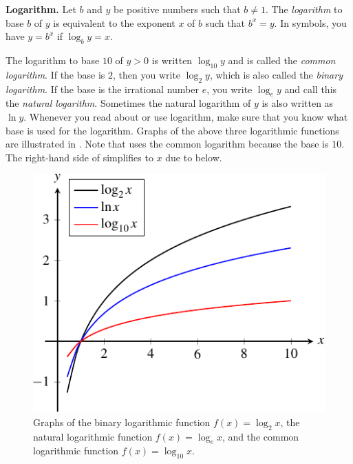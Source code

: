 \documentclass[a4paper,oneside,12pt]{article}
\begin{document}
\begin{definition}
\textbf{Logarithm.}
Let $b$ and $y$ be positive numbers such that $b \neq 1$.  The
\emph{logarithm} to base $b$ of $y$ is equivalent to the exponent $x$
of $b$ such that $b^x = y$.  In symbols, you have $y = b^x$ if
$\log_b y = x$.
\end{definition}

The logarithm to base $10$ of $y > 0$ is written $\log_{10} y$ and is
called the \emph{common logarithm}.  If the base is $2$, then you
write $\log_2 y$, which is also called the \emph{binary logarithm}.
If the base is the irrational number $e$, you write $\log_e y$ and
call this the \emph{natural logarithm}.  Sometimes the natural
logarithm of $y$ is also written as $\ln y$.  Whenever you read about
or use logarithm, make sure that you know what base is used for the
logarithm.  Graphs of the above three logarithmic functions are
illustrated in .  Note that
 uses the common logarithm because the base is
$10$.  The right-hand side of  simplifies to
$x$ due to  below.

\begin{figure}[!htbp]
\centering
\includegraphics[scale=1.1]{image/12/logarithm.pdf}
\caption{%
  Graphs of the binary logarithmic function $f(x) = \log_2 x$, the
  natural logarithmic function $f(x) = \log_e x$, and the common
  logarithmic function $f(x) = \log_{10} x$.
}
\label{fig:logarithm:graphs}
\end{figure}
\end{document}
